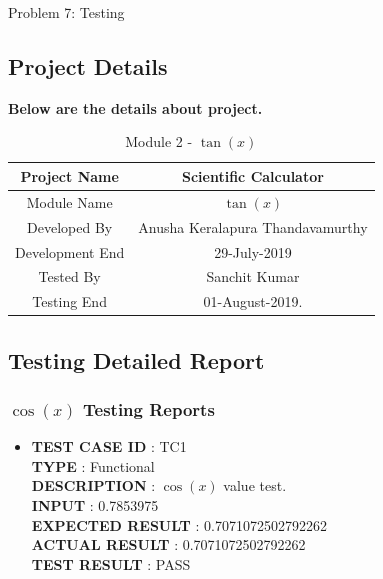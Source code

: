 \documentclass[a4paper,12pt]{article}
\begin{document}
\begin{section}{Problem 7: Testing}

\subsection{Project Details}
\textbf{Below are the details about project.}
\renewcommand{\arraystretch}{1.5}
\begin{table}[htp]
	\centering
	\caption{Module 2 - $\tan(x)$} \vspace{0.5cm} \label{tab:definition_table} 
	\begin{tabular}{||c|c||}
		\hline \hline 
		\LARGE Project Name & \LARGE Scientific Calculator  \\ 
		\hline
		\LARGE Module Name & \LARGE $\tan(x)$  \\
		\hline
		\LARGE Developed By & \LARGE Anusha Keralapura Thandavamurthy \\
		\hline
		\LARGE Development End & \LARGE 29-July-2019 \\
		\hline  
		\LARGE Tested By & \LARGE Sanchit Kumar \\
		\hline 
		\LARGE Testing End & \LARGE 01-August-2019. \\
		\hline \hline
	\end{tabular}
\end{table}

\subsection{Testing Detailed Report}
\subsubsection{$\cos(x)$ Testing Reports}
\begin{itemize}
	
	\item \textbf{TEST CASE ID} \hspace{1.25cm} : TC1  \\
	\textbf{TYPE } \hspace{3.15cm}  : Functional\\
	\textbf{DESCRIPTION }\hspace{1.25cm} : $\cos(x)$ value test. \\
	\textbf{INPUT} \hspace{3.05cm} :  0.7853975 \\
	\textbf{EXPECTED RESULT}\hspace{0.07cm} : 0.7071072502792262 \\
	\textbf{ACTUAL RESULT} \hspace{0.6cm} : 0.7071072502792262 \\
	\textbf{TEST RESULT} \hspace{1.40cm} : PASS \\
	

\end{itemize}
\end{section}
\end{document}
